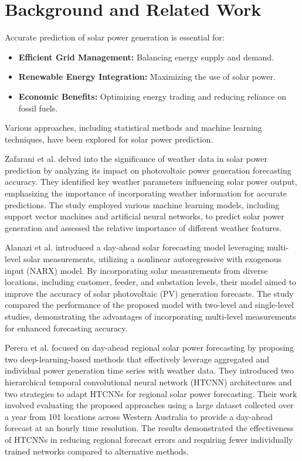 \section{Background and Related Work}
Accurate prediction of solar power generation is essential for:
\begin{itemize}
    \item \textbf{Efficient Grid Management:} Balancing energy supply and demand.
    \item \textbf{Renewable Energy Integration:} Maximizing the use of solar power.
    \item \textbf{Economic Benefits:} Optimizing energy trading and reducing reliance on fossil fuels.
\end{itemize}

Various approaches, including statistical methods and machine learning techniques, have been explored for solar power prediction.

Zafarani et al. \cite{arxiv1802.03913} delved into the significance of weather data in solar power prediction by analyzing its impact on photovoltaic power generation forecasting accuracy. They identified key weather parameters influencing solar power output, emphasizing the importance of incorporating weather information for accurate predictions. The study employed various machine learning models, including support vector machines and artificial neural networks, to predict solar power generation and assessed the relative importance of different weather features.

Alanazi et al. introduced a day-ahead solar forecasting model leveraging multi-level solar measurements, utilizing a nonlinear autoregressive with exogenous input (NARX) model. By incorporating solar measurements from diverse locations, including customer, feeder, and substation levels, their model aimed to improve the accuracy of solar photovoltaic (PV) generation forecasts. The study compared the performance of the proposed model with two-level and single-level studies, demonstrating the advantages of incorporating multi-level measurements for enhanced forecasting accuracy.

Perera et al. \cite{arxiv2403.01653} focused on day-ahead regional solar power forecasting by proposing two deep-learning-based methods that effectively leverage aggregated and individual power generation time series with weather data. They introduced two hierarchical temporal convolutional neural network (HTCNN) architectures and two strategies to adapt HTCNNs for regional solar power forecasting. Their work involved evaluating the proposed approaches using a large dataset collected over a year from 101 locations across Western Australia to provide a day-ahead forecast at an hourly time resolution. The results demonstrated the effectiveness of HTCNNs in reducing regional forecast errors and requiring fewer individually trained networks compared to alternative methods.

